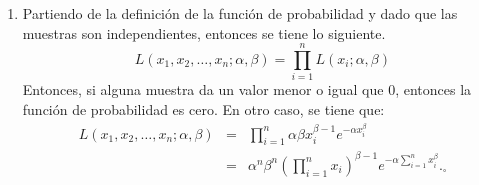 \begin{solucion}
 $\phantom{0}$
 \begin{enumerate}
  \item Partiendo de la definici\'on de la funci\'on de probabilidad y dado que las muestras son independientes, entonces se tiene lo siguiente. 
  \begin{equation*}
   L\left( x_1, x_2, \ldots, x_n; \alpha, \beta \right) = \prod_{i=1}^n L\left( x_i; \alpha , \beta \right)
  \end{equation*}
  Entonces, si alguna muestra da un valor menor o igual que $0$, entonces la funci\'on de probabilidad es cero. En otro caso, se tiene que:
  \begin{eqnarray*}
   L\left( x_1, x_2, \ldots, x_n; \alpha, \beta \right) & = & \prod_{i=1}^{n} \alpha \beta x_i^{\beta - 1} e^{-\alpha x_i^\beta} \\
   & = & \alpha^n \beta^n \left( \prod_{i=1}^{n} x_i \right)^{\beta - 1} e^{-\alpha \sum_{i=1}^{n} x_i^\beta}._{\square}
  \end{eqnarray*}


\end{enumerate}
\end{solucion}
